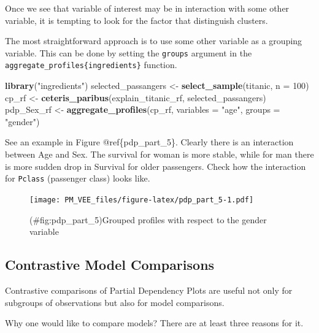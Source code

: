 \documentclass[12pt,]{krantz}
\newenvironment{Shaded}{\begin{snugshade}}{\end{snugshade}}
\newcommand{\DataTypeTok}[1]{\textcolor[rgb]{0.13,0.29,0.53}{#1}}
\newcommand{\DecValTok}[1]{\textcolor[rgb]{0.00,0.00,0.81}{#1}}
\newcommand{\KeywordTok}[1]{\textcolor[rgb]{0.13,0.29,0.53}{\textbf{#1}}}
\newcommand{\NormalTok}[1]{#1}
\newcommand{\StringTok}[1]{\textcolor[rgb]{0.31,0.60,0.02}{#1}}
\theoremstyle{definition}
\theoremstyle{definition}
\theoremstyle{definition}
\theoremstyle{remark}
\begin{document}
Once we see that variable of interest may be in interaction with some
other variable, it is tempting to look for the factor that distinguish
clusters.

The most straightforward approach is to use some other variable as a
grouping variable. This can be done by setting the \texttt{groups}
argument in the \texttt{aggregate\_profiles\{ingredients\}} function.

\begin{Shaded}
\begin{Highlighting}[]
\KeywordTok{library}\NormalTok{(}\StringTok{"ingredients"}\NormalTok{)}
\NormalTok{selected_passangers <-}\StringTok{ }\KeywordTok{select_sample}\NormalTok{(titanic, }\DataTypeTok{n =} \DecValTok{100}\NormalTok{)}
\NormalTok{cp_rf <-}\StringTok{ }\KeywordTok{ceteris_paribus}\NormalTok{(explain_titanic_rf, selected_passangers)}
\NormalTok{pdp_Sex_rf <-}\StringTok{ }\KeywordTok{aggregate_profiles}\NormalTok{(cp_rf, }\DataTypeTok{variables =} \StringTok{"age"}\NormalTok{,}
                \DataTypeTok{groups =} \StringTok{"gender"}\NormalTok{)}
\end{Highlighting}
\end{Shaded}

See an example in Figure @ref\{pdp\_part\_5\}. Clearly there is an
interaction between Age and Sex. The survival for woman is more stable,
while for man there is more sudden drop in Survival for older
passengers. Check how the interaction for \texttt{Pclass} (passenger
class) looks like.

\begin{figure}
\centering
\texttt{[image: PM\_VEE\_files/figure-latex/pdp\_part\_5-1.pdf]}
\caption{(\#fig:pdp\_part\_5)Grouped profiles with respect to the gender
variable}
\end{figure}

\hypertarget{contrastive-model-comparisons}{%
\subsection{Contrastive Model
Comparisons}\label{contrastive-model-comparisons}}

Contrastive comparisons of Partial Dependency Plots are useful not only
for subgroups of observations but also for model comparisons.

Why one would like to compare models? There are at least three reasons
for it.
\end{document}
